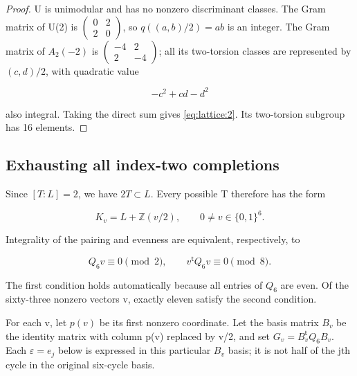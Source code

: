 \documentclass[11pt,a4paper,oneside]{article}
\theoremstyle{plain}
\theoremstyle{definition}
\theoremstyle{remark}
\numberwithin{equation}{section}
\begin{document}
\begin{proof}

U is unimodular and has no nonzero discriminant classes. The Gram matrix of U(2) is \(\left(\begin{smallmatrix}0&2\\2&0\end{smallmatrix}\right)\), so \(q((a,b)/2)=ab\) is an integer. The Gram matrix of \(A_2(-2)\) is \(\left(\begin{smallmatrix}-4&2\\2&-4\end{smallmatrix}\right)\); all its two-torsion classes are represented by \((c,d)/2\), with quadratic value

\begin{equation}
-c^2+cd-d^2
\end{equation}

also integral. Taking the direct sum gives \eqref{eq:lattice:2}. Its two-torsion subgroup has 16 elements.

\end{proof}


\subsection{Exhausting all index-two completions}\label{sec:lattice:3}

Since \([T:L]=2\), we have \(2T\subset L\). Every possible T therefore has the form

\begin{equation}
K_v=L+\mathbb Z(v/2),\qquad
 0\ne v\in\{0,1\}^6.                                           \label{eq:lattice:4}
\end{equation}

Integrality of the pairing and evenness are equivalent, respectively, to

\begin{equation}
Q_6v\equiv0\pmod2,\qquad v^{\mathsf t}Q_6v\equiv0\pmod8.         \label{eq:lattice:5}
\end{equation}

The first condition holds automatically because all entries of \(Q_6\) are even. Of the sixty-three nonzero vectors v, exactly eleven satisfy the second condition.

For each v, let \(p(v)\) be its first nonzero coordinate. Let the basis matrix \(B_v\) be the identity matrix with column p(v) replaced by v/2, and set \(G_v=B_v^{\mathsf t}Q_6B_v\). Each \(\varepsilon=e_j\) below is expressed in this particular \(B_v\) basis; it is not half of the jth cycle in the original six-cycle basis.
\end{document}
